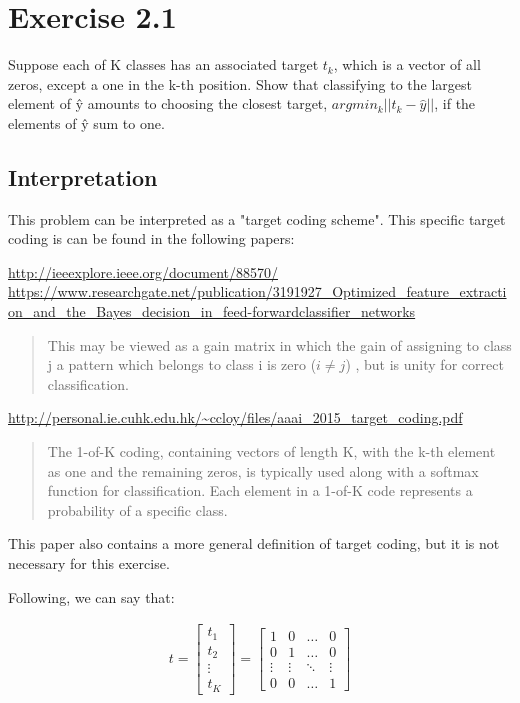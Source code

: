 \documentclass[10pt,a4paper]{article}
\author{Daniel Frederico Lins Leite}
\begin{document}
	\section{Exercise 2.1}
	Suppose each of K classes has an associated target $t_k$, which is a vector of all zeros, except a one in the k-th position. Show that classifying to the largest element of \^{y} amounts to choosing the closest target, $argmin_k ||t_k - \hat{y}||$, if the elements of \^{y} sum to one.
	
	\subsection{Interpretation}
	This problem can be interpreted as a "target coding scheme". This specific target coding is can be found in the following papers:
	
	\url{http://ieeexplore.ieee.org/document/88570/}\\
	\url{https://www.researchgate.net/publication/3191927_Optimized_feature_extraction_and_the_Bayes_decision_in_feed-forwardclassifier_networks}
	\begin{quote}
		This may be viewed as a gain matrix in which the gain of
		assigning to class j a pattern which belongs to class i is zero
		($i \ne j$) , but is unity for correct classification.
	\end{quote}
	
	\url{http://personal.ie.cuhk.edu.hk/~ccloy/files/aaai_2015_target_coding.pdf}
	\begin{quote}
		The 1-of-K coding, containing vectors of length K, with the k-th element as one and the remaining zeros, is typically used along with a softmax function for classification. Each element in a 1-of-K code represents a probability of a specific class. 
	\end{quote}
	
	This paper also contains a more general definition of target coding, but it is not necessary for this exercise.
	
	Following, we can say that:
	
	\begin{align*}
		t = \left[ \begin{array}{c}
		t_1 \\
		t_2 \\
		\vdots \\
		t_K \end{array} \right] = \left[ \begin{array}{cccc}
		1 & 0 & \dots & 0 \\
		0 & 1 & \dots & 0 \\
		\vdots & \vdots & \ddots & \vdots \\
		0 & 0 & \dots & 1 \end{array} \right]
	\end{align*}
	
\end{document}

